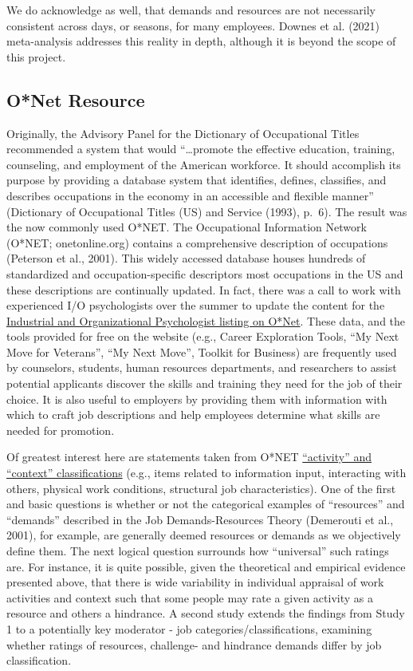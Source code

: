 \documentclass[
  man]{apa6}
\begin{document}
We do acknowledge as well, that demands and resources are not necessarily consistent across days, or seasons, for many employees. Downes et al. (2021) meta-analysis addresses this reality in depth, although it is beyond the scope of this project.

\hypertarget{onet-resource}{%
\subsection{O*Net Resource}\label{onet-resource}}

Originally, the Advisory Panel for the Dictionary of Occupational Titles recommended a system that would ``\ldots promote the effective education, training, counseling, and employment of the American workforce. It should accomplish its purpose by providing a database system that identifies, defines, classifies, and describes occupations in the economy in an accessible and flexible manner'' (Dictionary of Occupational Titles (US) and Service (1993), p.~6). The result was the now commonly used O*NET. The Occupational Information Network (O*NET; onetonline.org) contains a comprehensive description of occupations (Peterson et al., 2001). This widely accessed database houses hundreds of standardized and occupation-specific descriptors most occupations in the US and these descriptions are continually updated. In fact, there was a call to work with experienced I/O psychologists over the summer to update the content for the \href{https://www.onetonline.org/link/summary/19-3032.00}{Industrial and Organizational Psychologist listing on O*Net}. These data, and the tools provided for free on the website (e.g., Career Exploration Tools, ``My Next Move for Veterans'', ``My Next Move'', Toolkit for Business) are frequently used by counselors, students, human resources departments, and researchers to assist potential applicants discover the skills and training they need for the job of their choice. It is also useful to employers by providing them with information with which to craft job descriptions and help employees determine what skills are needed for promotion.

Of greatest interest here are statements taken from O*NET \href{https://www.O*NETonline.org/find/descriptor/result/4.A.1.b.3}{``activity'' and ``context'' classifications} (e.g., items related to information input, interacting with others, physical work conditions, structural job characteristics). One of the first and basic questions is whether or not the categorical examples of ``resources'' and ``demands'' described in the Job Demands-Resources Theory (Demerouti et al., 2001), for example, are generally deemed resources or demands as we objectively define them. The next logical question surrounds how ``universal'' such ratings are. For instance, it is quite possible, given the theoretical and empirical evidence presented above, that there is wide variability in individual appraisal of work activities and context such that some people may rate a given activity as a resource and others a hindrance. A second study extends the findings from Study 1 to a potentially key moderator - job categories/classifications, examining whether ratings of resources, challenge- and hindrance demands differ by job classification.
\end{document}
